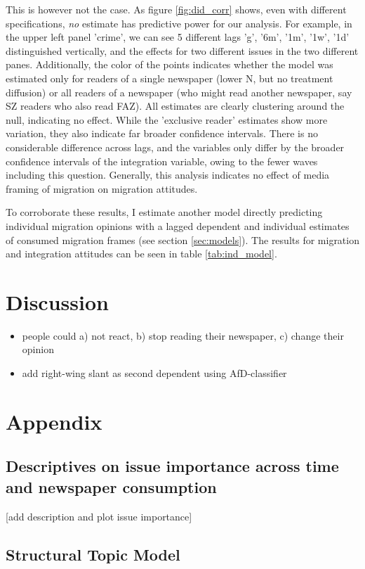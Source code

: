 \documentclass{article}
\begin{document}
This is however not the case. As figure \ref{fig:did_corr} shows, even with different specifications, \textit{no} estimate has predictive power for our analysis. For example, in the upper left panel 'crime', we can see 5 different lags 'g', '6m', '1m', '1w', '1d' distinguished vertically, and the effects for two different issues in the two different panes. Additionally, the color of the points indicates whether the model was estimated only for readers of a single newspaper (lower N, but no treatment diffusion) or all readers of a newspaper (who might read another newspaper, say SZ readers who also read FAZ). All estimates are clearly clustering around the null, indicating no effect. While the 'exclusive reader' estimates show more variation, they also indicate far broader confidence intervals. There is no considerable difference across lags, and the variables only differ by the broader confidence intervals of the integration variable, owing to the fewer waves including this question. Generally, this analysis indicates no effect of media framing of migration on migration attitudes.

To corroborate these results, I estimate another model directly predicting individual migration opinions with a lagged dependent and individual estimates of consumed migration frames (see section \ref{sec:models}). The results for migration and integration attitudes can be seen in table \ref{tab:ind_model}. 




\section{Discussion}
\begin{itemize}
    \item people could a) not react, b) stop reading their newspaper, c) change their opinion
    \item add right-wing slant as second dependent using AfD-classifier
\end{itemize}

\section{Appendix}

\subsection{Descriptives on issue importance across time and newspaper consumption}\label{app:importance}

[add description and plot issue importance]

\subsection{Structural Topic Model}\label{app:stm}
\end{document}
